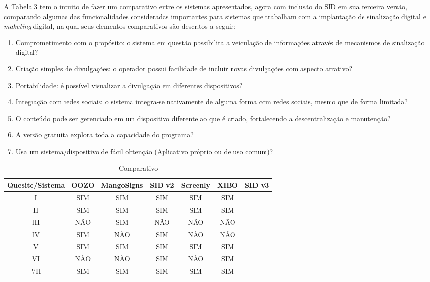 A Tabela 3 tem o intuito de fazer um comparativo entre os sistemas apresentados, agora com inclusão do SID em sua terceira versão, comparando algumas das funcionalidades consideradas importantes para sistemas que trabalham com a implantação de sinalização digital e \textit{maketing} digital, na qual seus elementos comparativos são descritos a seguir:
\begin{enumerate}[label=(\Roman*)]
	\item Comprometimento com o propósito: o sistema em questão possibilita a veiculação de informações através de mecanismos de sinalização digital?
	\item Criação simples de divulgações: o operador possui facilidade de incluir novas divulgações com aspecto atrativo?
	\item Portabilidade: é possível visualizar a divulgação em diferentes dispositivos?
	\item Integração com redes sociais: o sistema integra-se nativamente de alguma forma com redes sociais, mesmo que de forma limitada?
	\item O conteúdo pode ser gerenciado em um dispositivo diferente ao que é criado, fortalecendo a descentralização e manutenção?
	\item A versão gratuita explora toda a capacidade do programa?
	\item Usa um sistema/dispositivo de fácil obtenção (Aplicativo próprio ou de uso comum)?
\end{enumerate}

\begin{table}[h!]
	\caption{Comparativo}
	\centering
	\begin{tabular}{|c|c|c|c|c|c|c}
		\hline
		Quesito/Sistema & OOZO & MangoSigns & SID v2 & Screenly & XIBO & SID v3 \\ \hline
		I 				& SIM  & SIM		& SIM & SIM 	 & SIM	& \\ \hline
		II 				& SIM  & SIM 		& SIM & SIM 	 & SIM	 &\\ \hline
		III				& NÃO  & SIM 		& NÃO & NÃO 	 & NÃO	&\\ \hline
		IV 				& SIM  & NÃO 		& SIM & NÃO 	 & NÃO	&\\ \hline
		V 				& SIM  & SIM 		& SIM & SIM 	 & SIM	&\\ \hline
		VI 				& NÃO  & NÃO 		& SIM & NÃO 	 & SIM	&\\ \hline
		VII 			& SIM  & SIM 		& SIM & SIM 	 & SIM	&\\ \hline
	\end{tabular}
\end{table}

